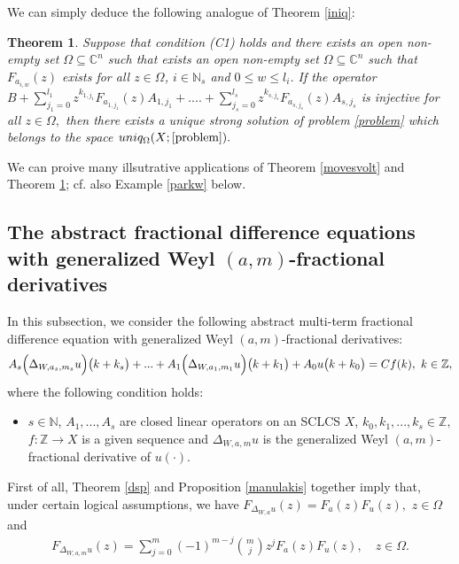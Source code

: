 \documentclass{amsart}
\newtheorem{thm}{Theorem}[section]
\theoremstyle{definition}
\theoremstyle{remark}
\numberwithin{equation}{section}
\begin{document}
We can simply deduce the following analogue of Theorem \ref{iniq}:

\begin{thm}\label{iniqvolt}
Suppose that condition \emph{(C1)} holds and there exists an open non-empty set  $\Omega \subseteq {\mathbb C}^{n}$ such that exists an open non-empty set $\Omega \subseteq {\mathbb C}^{n}$ such that $F_{a_{i,w}}(z)$ exists for all $z\in \Omega$, $ i\in {\mathbb N}_{s}$ and $0\leq w\leq l_{i}$. If the operator $B +\sum_{j_{1}=0}^{l_{1}}z^{k_{1,j_{1}}}F_{a_{1,j_{1}}}(z)A_{1,j_{1}} 
+....+\sum_{j_{s}=0}^{l_{s}}z^{k_{s,j_{s}}}F_{a_{s,j_{s}}}(z)A_{s,j_{s}}$ is injective for all $z\in \Omega ,$ then there exists a unique strong solution of problem \eqref{problem} which belongs to the space $uniq_{\Omega}(X;\eqref{problem}).$  
\end{thm}

We can proive many illsutrative applications of Theorem \ref{movesvolt} and Theorem \ref{iniqvolt}; cf. also Example \ref{parkw} below.

\subsection{The abstract fractional difference equations with generalized Weyl $(a,m)$-fractional derivatives}\label{ljeb}

In this subsection, we 
consider the following abstract multi-term fractional difference equation with generalized Weyl $(a,m)$-fractional derivatives:{\small
\begin{align}\label{qad}
A_{s}\Bigl(\Delta_{W,a_{s},m_{s}}u\Bigr)\bigl(k+k_{s}\bigr)+...+A_{1}\Bigl(\Delta_{W,a_{1},m_{1}}u\Bigr)\bigl(k+k_{1}\bigr)+A_{0}u\bigl(k+k_{0}\bigr)=Cf(k),\ k\in {\mathbb Z},
\end{align}}where 
the following condition holds:
\begin{itemize}
\item[(C2)]
$s\in {\mathbb N}$, $A_{1},...,A_{s}$ are closed linear operators on an SCLCS $X$, $k_{0},k_{1},...,k_{s}\in {\mathbb Z},$ $ f: {\mathbb Z} \rightarrow X$ is a given sequence and $\Delta_{W,a,m}u$ is the generalized Weyl $(a,m)$-fractional derivative of $u(\cdot).$
\end{itemize}

First of all, Theorem \ref{dsp} and Proposition \ref{manulakis} together imply that, under certain logical assumptions, we have
$F_{\Delta_{W,a}u}(z)=F_{a}(z) F_{u}(z),$
$z\in \Omega$ and 
\begin{align}\label{cos}
F_{\Delta_{W,a,m}u}(z)=\sum_{j=0}^{m}(-1)^{m-j}\binom{m}{j}z^{j}F_{a}(z)F_{u}(z),\quad z\in \Omega.
\end{align}
\end{document}
